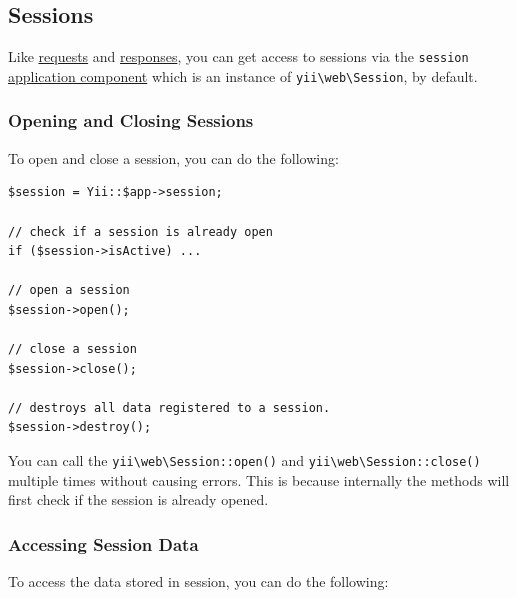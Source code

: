 \subsection{Sessions \label{runtime-sessions-cookies.md::sessions}}
Like \hyperref[runtime-requests.md]{requests} and \hyperref[runtime-responses.md]{responses}, you can get access to sessions via
the \lstinline|session| \hyperref[structure-application-components.md]{application component} which is an instance of \texttt{yii{\allowbreak{}\textbackslash}web{\allowbreak{}\textbackslash}Session},
by default.

\subsubsection{Opening and Closing Sessions \label{runtime-sessions-cookies.md::opening-closing-sessions}}
To open and close a session, you can do the following:

\lstset{language=php}\begin{lstlisting}
$session = Yii::$app->session;

// check if a session is already open
if ($session->isActive) ...

// open a session
$session->open();

// close a session
$session->close();

// destroys all data registered to a session.
$session->destroy();
\end{lstlisting}
You can call the \texttt{yii{\allowbreak{}\textbackslash}web{\allowbreak{}\textbackslash}Session\allowbreak{}::\allowbreak{}open()} and \texttt{yii{\allowbreak{}\textbackslash}web{\allowbreak{}\textbackslash}Session\allowbreak{}::\allowbreak{}close()} multiple times
without causing errors. This is because internally the methods will first check if the session is already opened.

\subsubsection{Accessing Session Data \label{runtime-sessions-cookies.md::access-session-data}}
To access the data stored in session, you can do the following:

